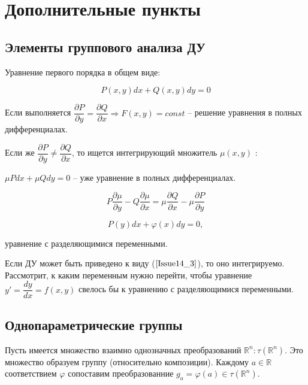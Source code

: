 
\section{Дополнительные пункты}

\subsection{Элементы группового анализа ДУ}

Уравнение первого порядка в общем виде:

\begin{equation}
	P(x,y)dx + Q(x,y)dy = 0
	\label{Issue14_1}
\end{equation}

Если выполняется $\dfrac{\partial P}{\partial y} = \dfrac{\partial Q}{\partial x} \Rightarrow F(x,y) = const$ -- решение уравнения в полных дифференциалах.

Если же $\dfrac{\partial P}{\partial y} \neq \dfrac{\partial Q}{\partial x}$, то ищется интегрирующий множитель $\mu(x,y)$ :

$\mu Pdx + \mu Qdy = 0$ -- уже уравнение в полных дифференциалах.

\begin{equation}
	P\frac{\partial \mu}{\partial y} - Q \frac{\partial \mu}{\partial x} = \mu \dfrac{\partial Q}{\partial x} - \mu \dfrac{\partial P}{\partial y}
	\label{Issue14_2}
\end{equation}

\begin{equation}
	P(y)dx + \varphi(x)dy = 0,
	\label{Issue14_3}
\end{equation}

уравнение с разделяющимися переменными.

Если ДУ может быть приведено к виду ($\ref{Issue14_3}$), то оно интегрируемо. Рассмотрит, к каким переменным нужно перейти, чтобы уравнение $y' = \dfrac{dy}{dx} = f(x,y)$ свелось бы к уравнению с разделяющимися переменными.

\subsection{Однопараметрические группы}

Пусть имеется множество взаимно однозначных преобразований $\mathbb{R}^n: \tau(\mathbb{R}^n)$.
Это множество образуем группу (относительно композиции). Каждому $a \in \mathbb{R}$ соответствием $\varphi$ сопоставим преобразованние $g_a = \varphi(a) \in \tau(\mathbb{R}^n)$.

